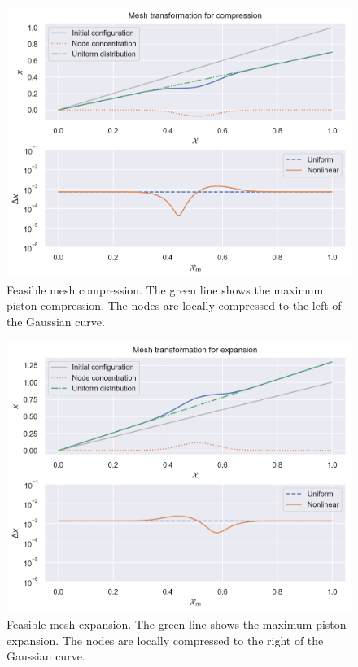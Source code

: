 \documentclass[../../thesis.tex]{subfiles}
\begin{document}
\newpage
\begin{figure}[h]
    \includegraphics[width =\columnwidth]{research_project/piston/figures/nonlinear_displacement/separable/mapping_mu_05_sigma_01_p_05_compression.png}
    \caption{Feasible mesh compression. 
    The green line shows the maximum piston compression.
    The nodes are locally compressed to the left of the Gaussian curve.}
    \label{fig:mesh_disp_compression}
\end{figure}
\begin{figure}[h]
    \includegraphics[width =\columnwidth]{research_project/piston/figures/nonlinear_displacement/separable/mapping_mu_05_sigma_01_p_075_expansion.png}
    \caption{Feasible mesh expansion. 
    The green line shows the maximum piston expansion.
    The nodes are locally compressed to the right of the Gaussian curve.}
    \label{fig:mesh_disp_expansion}
\end{figure}
\end{document}
